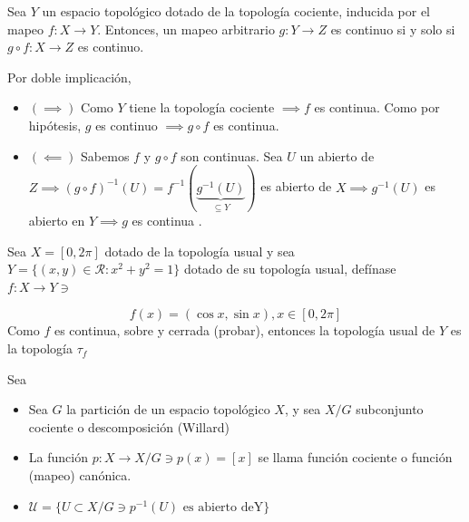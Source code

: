 \begin{teorema}
    Sea $Y$ un espacio topológico dotado de la topología cociente, inducida por el mapeo $f:X\to Y$. Entonces, un mapeo arbitrario $g:Y\to Z$ es continuo si y solo si $g\circ f:X\to Z$ es continuo.
    \begin{dem}
        Por doble implicación,
        \begin{itemize}
            \item $(\implies)$ Como $Y$ tiene la topología cociente $\implies f$ es continua. Como por hipótesis, $g$ es continuo $\implies g\circ f$ es continua. 
            \item $(\impliedby)$ Sabemos $f$ y $g\circ f$ son continuas. Sea $U$ un abierto de $Z\implies (g\circ f)^{-1}(U)=f^{-1}(\underbrace{g^{-1}(U)}_{\subseteq Y})$ es abierto de $X\implies g^{-1}(U)$ es abierto en $Y\implies g $ es continua .  
        \end{itemize}
    \end{dem}
\end{teorema}
\begin{ejemplo}
    Sea $X=[0,2\pi]$ dotado de la topología usual y sea $Y=\{(x,y)\in \mathcal{R}:x^2+y^2=1\}$ dotado de su topología usual, defínase $f:X\to Y\ni $

$$f(x)=(\cos x,\sin x), x\in [0,2\pi ]$$
Como $f$ es continua, sobre y cerrada (probar), entonces la topología usual de $Y$ es la topología $\tau_f$
\end{ejemplo}
\begin{nota}
    Sea 
    \begin{itemize}
        \item Sea $G$ la partición de un espacio topológico $X$, y sea $X/G$ subconjunto cociente o descomposición (Willard)
        \item La función $p:X\to X/G\ni p(x)=[x]$ se llama función cociente o función (mapeo) canónica. 
        \item $\mathcal{U}=\{U\subset X/G\ni p^{-1}(U)\text{ es abierto de} $Y$ \}$
    \end{itemize}
    
\end{nota}

